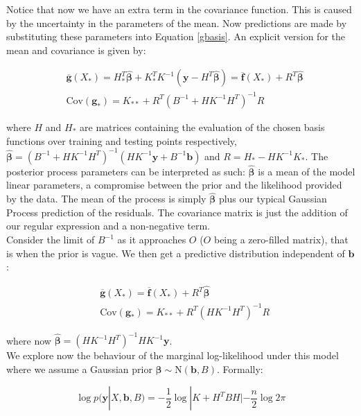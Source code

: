 \documentclass[10pt,a4paper,twoside]{book}
\begin{document}
Notice that now we have an extra term in the covariance function. This is caused by the uncertainty in the parameters of the mean. Now predictions are made by substituting these parameters into Equation \ref{gbasis}. An explicit version for the mean and covariance is given by:

\begin{align}
&\overline{\boldsymbol{g}}(X_*) = H^T_* \hat{\boldsymbol{\beta}} + K_*^T K^{-1}(\boldsymbol{y} - H^T\hat{\boldsymbol{\beta}}) = \overline{\boldsymbol{f}}(X_*) + R^T\hat{\boldsymbol{\beta}}\\
&\mathrm{Cov}(\boldsymbol{g_*}) = K_{**} + R^T(B^{-1} + HK^{-1}H^T)^{-1}R
\end{align}

where $H$ and $H_*$ are matrices containing the evaluation of the chosen basis functions over training and testing points respectively, $\hat{\boldsymbol{\beta}} = (B^{-1} + H K^{-1} H^T)^{-1}(H K^{-1}\boldsymbol{y} + B^{-1}\boldsymbol{b})$ and $R = H_* - HK^{-1}K_{*}$. The posterior process parameters can be interpreted as such: $\hat{\boldsymbol{\beta}}$ is a mean of the model linear parameters, a compromise between the prior and the likelihood provided by the data. The mean of the process is simply $\hat{\boldsymbol{\beta}}$ plus our typical Gaussian Process prediction of the residuals. The covariance matrix is just the addition of our regular expression and a non-negative term.\\

Consider the limit of $B^{-1}$ as it approaches $O$ ($O$ being a zero-filled matrix), that is when the prior is vague. We then get a predictive distribution independent of $\boldsymbol{b}$:

\begin{align}
&\overline{\boldsymbol{g}}(X_*) = \overline{\boldsymbol{f}}(X_*) + R^T\hat{\boldsymbol{\beta}}\\
&\mathrm{Cov}(\boldsymbol{g_*}) = K_{**} + R^T\left(HK^{-1}H^T\right)^{-1}R
\end{align}

where now $\hat{\boldsymbol{\beta}} = \left(HK^{-1}H^T\right)^{-1}HK^{-1}\boldsymbol{y}$.\\

We explore now the behaviour of the marginal log-likelihood under this model where we assume a Gaussian prior $\boldsymbol{\beta} \sim \mathrm{N}(\boldsymbol{b}, B)$. Formally:

\begin{equation}
\log p(\boldsymbol{y}|X, \boldsymbol{b}, B) = -\dfrac{1}{2}\log |K + H^T B H| - \dfrac{n}{2}\log 2\pi
\end{equation}
\end{document}
